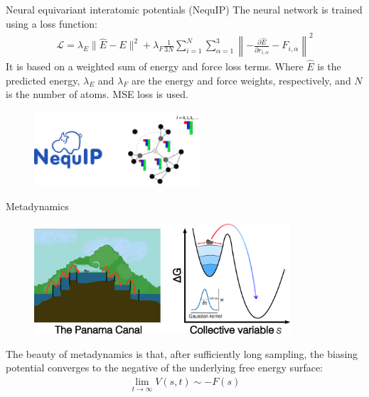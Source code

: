 \documentclass[11pt,t]{beamer}
\begin{document}
\begin{frame}{Neural equivariant interatomic potentials (NequIP)}
	\small
	The neural network is trained using a loss function:
	\begin{gather*}
		\mathcal{L} = \lambda_E \lVert \hat{E} - E \rVert^2 + \lambda_F \frac{1}{3N} \sum_{i=1}^{N} \sum_{\alpha=1}^{3} \left\lVert -\frac{\partial \hat{E}}{\partial r_{i,\alpha}} - F_{i,\alpha} \right\rVert^2
		\label{eq:loss_function}
	\end{gather*}
	It is based on a weighted sum of energy and force loss terms. Where $\hat{E}$ is the predicted energy, $\lambda_E$ and $\lambda_F$ are the energy and force weights, respectively, and $N$ is the number of atoms. MSE loss is used.
	\begin{figure}
		\centering
		\includegraphics[width=0.55\textwidth]{Figures/theory_nequip.png}
	\end{figure}
\end{frame}



\begin{frame}{Metadynamics}
	\vspace{-10pt}
	\begin{figure}
		\centering
		\includegraphics[width=0.85\textwidth]{Figures/theory_metadynamics.png}
	\end{figure}
	\small
	The beauty of metadynamics is that, after sufficiently long sampling, the biasing potential converges to the negative of the underlying free energy surface:
	\vspace{-5pt}
	\begin{gather*}
    	\lim_{t \to \infty} V(s,t) \sim -F(s)
	\end{gather*}
\end{frame}
\end{document}
